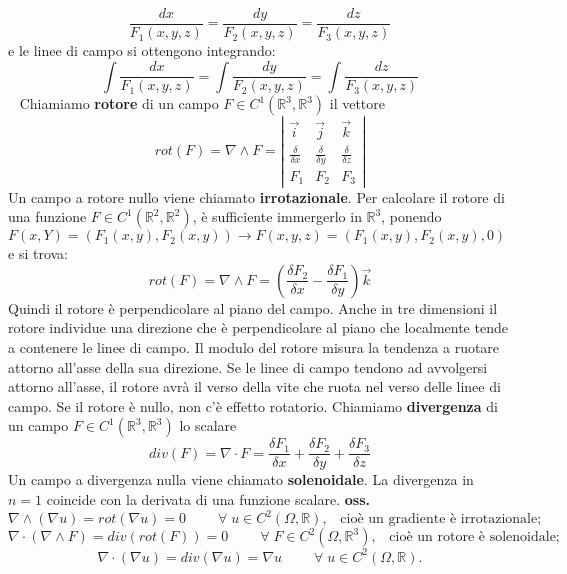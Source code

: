 \[
    \frac{dx}{F_1(x,y,z)} = 
    \frac{dy}{F_2(x,y,z)} = 
    \frac{dz}{F_3(x,y,z)}
\]
e le linee di campo si ottengono integrando:
\[
    \int \frac{dx}{F_1(x,y,z)} = 
    \int \frac{dy}{F_2(x,y,z)} = 
    \int \frac{dz}{F_3(x,y,z)}
\]
\ \newline
\newline
Chiamiamo \textbf{rotore} di un campo $F \in C^1(\mathbb{R}^3, \mathbb{R}^3)$ il vettore
\[
    rot(F) = \nabla \land F = \left|\begin{matrix}
        \vec{i} & \vec{j} & \vec{k} \\
        \frac{\delta }{\delta x} & \frac{\delta }{\delta y} & \frac{\delta }{\delta z}\\
        F_1 & F_2 & F_3
    \end{matrix} \right|
\]
Un campo a rotore nullo viene chiamato \textbf{irrotazionale}.\newline
Per calcolare il rotore di una funzione $F \in C^1(\mathbb{R}^2, \mathbb{R}^2)$, è sufficiente immergerlo in $\mathbb{R}^3$, ponendo $F(x,Y) = (F_1(x,y), F_2(x,y)) \rightarrow  F(x,y,z) = (F_1(x,y), F_2(x,y), 0)$ e si trova:
\[
    rot(F) = \nabla\land F = \left(\frac{\delta F_2}{\delta x} - \frac{\delta F_1}{\delta y}\right)\vec{k}
\]
Quindi il rotore è perpendicolare al piano del campo.\newline
Anche in tre dimensioni il rotore individue una direzione che è perpendicolare al piano che localmente tende a contenere le linee di campo.\newline
Il modulo del rotore misura la tendenza a ruotare attorno all'asse della sua direzione. Se le linee di campo tendono ad avvolgersi attorno all'asse, il rotore avrà il verso della vite che ruota nel verso delle linee di campo. Se il rotore è nullo, non c'è effetto rotatorio.\newline
\newline
\newline
Chiamiamo \textbf{divergenza} di un campo $F \in C^1(\mathbb{R}^3, \mathbb{R}^3)$ lo scalare
\[
    div(F) = \nabla \cdot F = \frac{\delta F_1}{\delta x} +\frac{\delta F_2}{\delta y} +\frac{\delta F_3}{\delta z}
\]
Un campo a divergenza nulla viene chiamato \textbf{solenoidale}.\newline
La divergenza in $n=1$ coincide con la derivata di una funzione scalare.\newline
\newline
\newline
\textbf{oss.} 
\[
    \nabla \land (\nabla u) = rot(\nabla u) = 0 \quad \quad \;\forall\;u \in C^2(\Omega, \mathbb{R}), \;\;\; \text{cioè un gradiente è irrotazionale;}
\]
\[
    \nabla \cdot  (\nabla \land F) = div(rot(F)) = 0 \quad \quad \;\forall\; F \in C^2(\Omega, \mathbb{R}^3), \;\;\;\text{cioè un rotore è solenoidale;}
\]
\[
    \nabla \cdot (\nabla u) = div(\nabla u) = \nabla u \quad \quad \;\forall\;u \in C^2(\Omega, \mathbb{R}).
\]
